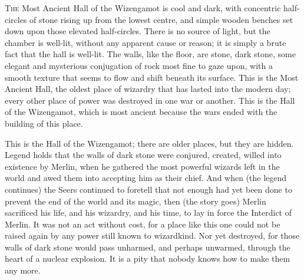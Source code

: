 
\lettrine{T}{he} Most Ancient
Hall of the Wizengamot is cool and dark, with concentric half-circles of stone
rising up from the lowest centre, and simple wooden benches set down upon those
elevated half-circles. There is no source of light, but the chamber is
well-lit, without any apparent cause or reason; it is simply a brute fact that
the hall is well-lit. The walls, like the floor, are stone, dark stone, some
elegant and mysterious conjugation of rock most fine to gaze upon, with a
smooth texture that seems to flow and shift beneath its surface. This is the
Most Ancient Hall, the oldest place of wizardry that has lasted into the modern
day; every other place of power was destroyed in one war or another. This is
the Hall of the Wizengamot, which is most ancient because the wars ended with
the building of this place.

This is the Hall of the Wizengamot; there are older places, but they are
hidden. Legend holds that the walls of dark stone were conjured, created,
willed into existence by Merlin, when he gathered the most powerful wizards
left in the world and awed them into accepting him as their chief. And when
(the legend continues) the Seers continued to foretell that not enough had yet
been done to prevent the end of the world and its magic, then (the story goes)
Merlin sacrificed his life, and his wizardry, and his time, to lay in force the
Interdict of Merlin. It was not an act without cost, for a place like this one
could not be raised again by any power still known to wizardkind. Nor yet
destroyed, for those walls of dark stone would pass unharmed, and perhaps
unwarmed, through the heart of a nuclear explosion. It is a pity that nobody
knows how to make them any more.

